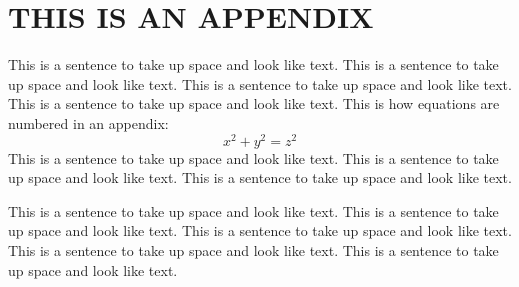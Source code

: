  
\section{THIS IS AN APPENDIX}
This is a sentence to take up space and look like text.
This is a sentence to take up space and look like text.
This is a sentence to take up space and look like text.
This is a sentence to take up space and look like text.
This is how equations are numbered in an appendix:
\begin{equation}
x^2 + y^2 = z^2
\end{equation} 
This is a sentence to take up space and look like text.
This is a sentence to take up space and look like text.
This is a sentence to take up space and look like text.
 
This is a sentence to take up space and look like text.
This is a sentence to take up space and look like text.
This is a sentence to take up space and look like text.
This is a sentence to take up space and look like text.
This is a sentence to take up space and look like text. 

